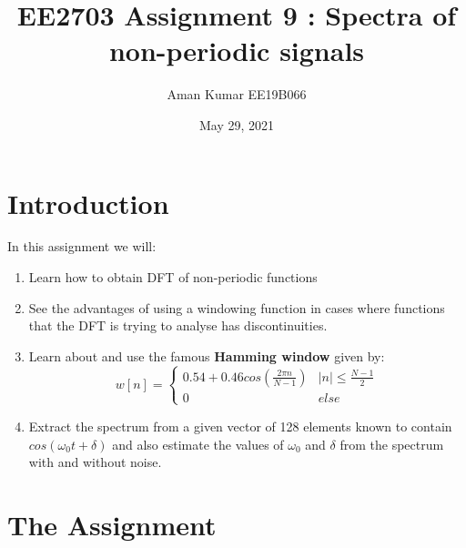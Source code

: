 \documentclass[11pt, a4paper]{article}
\title{EE2703 Assignment 9 : Spectra of non-periodic signals}
\author{Aman Kumar EE19B066}
\date{May 29, 2021}
\begin{document}
\maketitle

\section{Introduction}
In this assignment we will:
    \begin{enumerate}
    \item Learn how to obtain DFT of non-periodic functions
    \item See the advantages of using a windowing function in cases where functions that the DFT is trying to analyse has discontinuities.
    \item Learn about and use the famous \textbf{Hamming window} given by:
        \begin{equation}
            w[n] = 
            \begin{cases}
            0.54 + 0.46cos(\frac{2\pi n}{N - 1}) & \lvert{n}\rvert \leq \frac{N - 1}{2} \\
            0 & else
            \end{cases}
        \end{equation}
    \item Extract the spectrum from a given vector of 128 elements known to contain $cos(\omega_0 t + \delta)$ and also estimate the values of $\omega_0$ and $\delta$ from the spectrum with and without noise.
    \end{enumerate}

\section{The Assignment}
\end{document}
